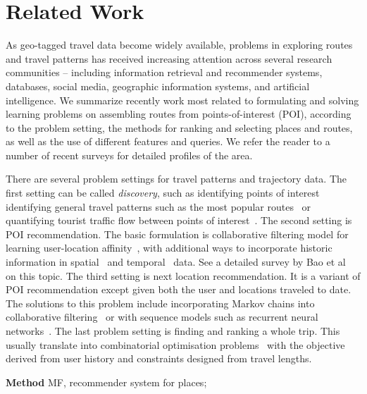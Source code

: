 
\section{Related Work}
\label{sec:relatedwork}

As geo-tagged travel data become widely available, problems in exploring routes and travel patterns has received increasing attention across several research communities -- including information retrieval and recommender systems, databases, social media, geographic information systems, and artificial intelligence. 
We summarize recently work most related to formulating and solving learning problems on assembling routes 
from points-of-interest (POI), according to the problem setting, the methods for ranking and selecting places and routes, as well as the use of different features and queries. We refer the reader to a number of recent surveys\cite{bao2015recommendations,zheng2015trajectory,zheng2014urban} for detailed profiles of the area.

There are several problem settings for travel patterns and trajectory data. 
The first setting can be called {\em discovery}, such as identifying points of interest~\cite{zheng2009mining} identifying general travel patterns such as the most popular routes~\cite{lu2010photo2trip} or 
quantifying tourist traffic flow between points of interest~\cite{zheng2012patterns}. 
The second setting is POI recommendation. The basic formulation is collaborative filtering model for learning user-location affinity~\cite{shi2011personalized}, with additional ways to incorporate historic information in spatial~\cite{lian2014geomf} and temporal~\cite{gao2013temporal} data. See a detailed survey by Bao et al~\cite{bao2015recommendations} on this topic. 
The third setting is next location recommendation. It is a variant of POI recommendation except given both the user and locations traveled to date. The solutions to this problem include incorporating Markov chains into collaborative filtering~\cite{fpmc10,ijcai13} or with sequence models such as recurrent neural networks~\cite{aaai16}. 
The last problem setting is finding and ranking a whole trip. This usually translate into combinatorial optimisation problems~\cite{ijcai15,lu2012personalized} with the objective derived from user history and constraints designed from travel lengths.


{\bf Method}
MF, recommender system for places;

